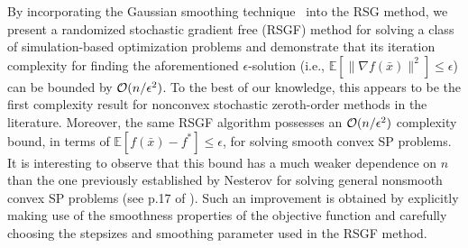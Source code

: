 \documentclass[final]{siamltex}
\newcommand{\beq}{\begin{equation}}
\newcommand{\eeq}{\end{equation}}
\newcommand{\bbe}{\mathbb{E}}
\newcommand{\bbr}{\mathbb{R}}
\begin{document}
By incorporating the Gaussian smoothing technique~\cite{Nest11-1} into the RSG method,
we present a randomized stochastic gradient free (RSGF) method
for solving a class of simulation-based optimization problems and
demonstrate that its iteration complexity for finding
the aforementioned $\epsilon$-solution (i.e., $\bbe[\|\nabla f(\bar x)\|^2] \le \epsilon$)
can be bounded by ${\cal O}(n/\epsilon^2)$. To the best of our knowledge,
this appears to be the first complexity result for nonconvex stochastic zeroth-order methods in the literature.
Moreover, the same RSGF algorithm possesses an ${\cal O}(n/\epsilon^2)$
complexity bound, in terms of $\bbe[f(\bar x) - f^*] \le \epsilon$,
for solving smooth convex SP problems. It is interesting to observe that
this bound has a much weaker dependence on $n$ than 
the one previously established by Nesterov for solving general nonsmooth convex SP problems (see p.17 of \cite{Nest11-1}). 
Such an improvement is obtained by explicitly making use of the smoothness properties of
the objective function and carefully choosing the stepsizes and smoothing
parameter used in the RSGF method.


\end{document}
